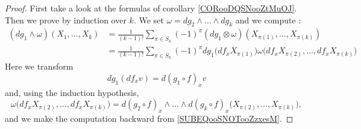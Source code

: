 \begin{proof}
	First take a look at the formulas of corollary \ref{CORooDQSNooZtMuOJ}. Then we prove by induction over \( k\). We set \( \omega=dg_2\wedge\ldots \wedge dg_k\) and we compute :
	\begin{subequations}
		\begin{align}
			(dg_1\wedge \omega)(X_1,\ldots,X_k) & =\frac{1}{ (k-1)!}\sum_{\pi\in S_k}(-1)^{\pi}(dg_1\otimes \omega)(X_{\pi(1)}, \ldots,X_{\pi(k)})                                   \\
			                                    & =\frac{1}{ (k-1)!}\sum_{\pi\in S_k}(-1)^{\pi}dg_1\big( df_x X_{\pi(1)} \big)\omega\big( df_xX_{\pi(2)},\ldots,df_xX_{\pi(k)} \big)
		\end{align}
	\end{subequations}
	Here we transform
	\begin{equation}
		dg_1(df_x v)=d(g_1\circ f)_xv
	\end{equation}
	and, using the induction hypothesis,
	\begin{equation}
		\omega\big( df_xX_{\pi(2)},\ldots,df_xX_{\pi(k)} \big)=d(g_2\circ f)_x\wedge\ldots\wedge d(g_k\circ f)_x\big( X_{\pi(2)},\ldots,X_{\pi(k)} \big),
	\end{equation}
	and we make the computation backward from \eqref{SUBEQooSNOTooZzxesM}.
\end{proof}
